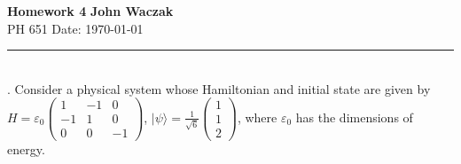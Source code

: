 \documentclass[a4paper, 11pt]{article}
\newcommand{\ket}[1]{|#1\rangle}
\begin{document}
\noindent
\large\textbf{Homework 4} \hfill \textbf{John Waczak} \\
\normalsize PH 651 \hfill  Date: \today \\
\par\noindent\rule{\textwidth}{0.4pt}	\\

. Consider a physical system whose Hamiltonian and initial state are given by $H = \varepsilon_0\begin{pmatrix} 1 & -1 & 0 \\ -1 & 1 & 0 \\ 0 & 0 & -1 \end{pmatrix}$, $\ket{\psi} = \frac{1}{\sqrt{6}}\begin{pmatrix}1 \\ 1 \\ 2 \end{pmatrix}$, where $\varepsilon_0$ has the dimensions of energy. \\ 
\end{document}
